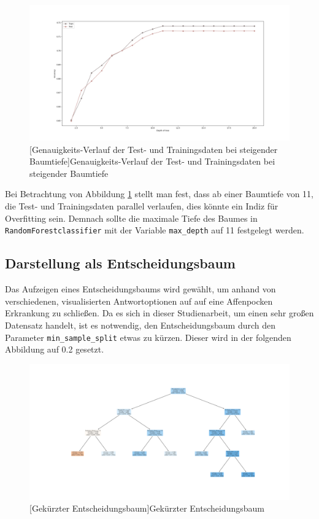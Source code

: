 \documentclass[13pt,a4paper, listof=entryprefix, bibliography=totocnumbered,toc=listofnumbered,lof=listofnumbered]{scrartcl}
\begin{document}
	\begin{figure}[H]
		\centering
		\includegraphics[width=0.8\linewidth]{Bilder/overfitting_plot.png}
		[Genauigkeits-Verlauf der Test- und Trainingsdaten bei steigender Baumtiefe]{Genauigkeits-Verlauf der Test- und Trainingsdaten bei steigender Baumtiefe}
		\label{fig:overfitting}
	\end{figure}

	Bei Betrachtung von Abbildung \ref{fig:overfitting} stellt man fest, dass ab einer Baumtiefe von 11, die Test- und Trainingsdaten parallel 
	verlaufen, dies könnte ein Indiz für Overfitting sein. Demnach sollte die maximale Tiefe des Baumes in
	\lstinline{RandomForestclassifier} mit der Variable \lstinline{max_depth} auf 11 festgelegt werden.  


	\subsection{Darstellung als Entscheidungsbaum}
		\label{ch:entscheidungsbaum}

	Das Aufzeigen eines Entscheidungsbaums wird gewählt, um anhand von verschiedenen, visualisierten Antwortoptionen auf auf eine Affenpocken Erkrankung zu schließen.
	Da es sich in dieser Studienarbeit, um einen sehr großen Datensatz handelt, ist es notwendig, den Entscheidungsbaum durch den Parameter \lstinline{min_sample_split} etwas zu kürzen. Dieser wird in der folgenden Abbildung auf 
	0.2 gesetzt. 

	\begin{figure}[H]
		\centering
		\includegraphics[width=0.8\linewidth]{Bilder/decision_tree.png}
		[Gekürzter Entscheidungsbaum]{Gekürzter Entscheidungsbaum}
		\label{fig:decisiontree}
	\end{figure}
\end{document}
